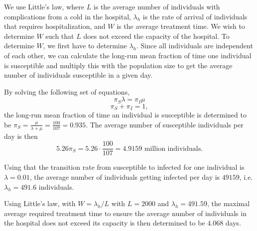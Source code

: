 We use Little's law, where $L$ is the average number of individuals with complications from a cold in the hospital, $\lambda_h$ is the rate of arrival of individuals that requires hospitalization, and $W$ is the average treatment time. We wish to determine $W$ such that $L$ does not exceed the capacity of the hospital.
To determine $W$, we first have to determine $\lambda_h$. Since all individuals are independent of each other, we can calculate the long-run mean fraction of time one individual is susceptible and multiply this with the population size to get the average number of individuals susceptible in a given day.

By solving the following set of equations,
$$ \pi_S \lambda = \pi_I \mu$$
$$ \pi_S + \pi_I = 1 ,$$ 
the long-run mean fraction of time an individual is susceptible is determined to be $\pi_S = \frac{\mu}{\lambda + \mu} = \frac{100}{107} = 0.935.$
The average number of susceptible individuals per day is then 
$$ 5.26  \pi_S = 5.26 \cdot \frac{100}{107} = 4.9159 \text{ million individuals.}$$

Using that the transition rate from susceptible to infected for one individual is $\lambda = 0.01$, the average number of individuals getting infected per day is $49159$, i.e. $\lambda_h = 491.6$ individuals. 

Using Little's law, with $W = \lambda_h/L$ with $L = 2000$ and $\lambda_h = 491.59$, the maximal average required treatment time to ensure the average number of individuals in the hospital does not exceed its capacity is then determined to be $4.068$ days.
